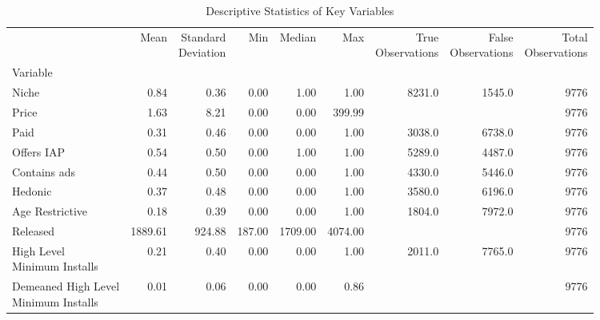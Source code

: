 \begin{table}[h!]
\centering
\caption{Descriptive Statistics of Key Variables}
\label{table:2}
\begin{tabular}{lrrrrrrrr}
\toprule
{} &      Mean &  \makecell[l]{Standard \\ Deviation} &     Min &   Median &          Max &  \makecell[l]{True \\ Observations} &  \makecell[l]{False \\ Observations} &  \makecell[l]{Total \\ Observations} \\
Variable                                                &           &                                      &         &          &              &                                     &                                      &                                      \\
\midrule
Niche                                                   &  0.84 &  0.36 &  0.00 &  1.00 &  1.00 &  8231.0 &  1545.0 &  9776 \\
Price                                                   &  1.63 &  8.21 &  0.00 &  0.00 &  399.99 & {} & {} &  9776 \\
Paid                                                    &  0.31 &  0.46 &  0.00 &  0.00 &  1.00 &  3038.0 &  6738.0 &  9776 \\
Offers IAP                                              &  0.54 &  0.50 &  0.00 &  1.00 &  1.00 &  5289.0 &  4487.0 &  9776 \\
Contains ads                                            &  0.44 &  0.50 &  0.00 &  0.00 &  1.00 &  4330.0 &  5446.0 &  9776 \\
Hedonic                                                 &  0.37 &  0.48 &  0.00 &  0.00 &  1.00 &  3580.0 &  6196.0 &  9776 \\
Age Restrictive                                         &  0.18 &  0.39 &  0.00 &  0.00 &  1.00 &  1804.0 &  7972.0 &  9776 \\
Released                                                &  1889.61 &  924.88 &  187.00 &  1709.00 &  4074.00 & {} & {} &  9776 \\
\makecell[l]{High Level \\ Minimum Installs}            &  0.21 &  0.40 &  0.00 &  0.00 &  1.00 &  2011.0 &  7765.0 &  9776 \\
\makecell[l]{Demeaned High Level \\ Minimum Installs}   &  0.01 &  0.06 &  0.00 &  0.00 &  0.86 & {} & {} &  9776 \\

\end{tabular}
\end{table}
